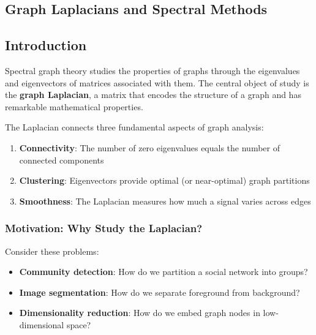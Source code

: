 \begin{notechapter}
\chapter{Graph Laplacians and Spectral Methods}\label{ch:graph-laplacians}

\section{Introduction}

Spectral graph theory studies the properties of graphs through the eigenvalues and eigenvectors of matrices associated with them. The central object of study is the \textbf{graph Laplacian}, a matrix that encodes the structure of a graph and has remarkable mathematical properties.

\begin{keyidea}
The Laplacian connects three fundamental aspects of graph analysis:
\begin{enumerate}
    \item \textbf{Connectivity}: The number of zero eigenvalues equals the number of connected components
    \item \textbf{Clustering}: Eigenvectors provide optimal (or near-optimal) graph partitions
    \item \textbf{Smoothness}: The Laplacian measures how much a signal varies across edges
\end{enumerate}
\end{keyidea}

\subsection{Motivation: Why Study the Laplacian?}

Consider these problems:
\begin{itemize}
    \item \textbf{Community detection}: How do we partition a social network into groups?
    \item \textbf{Image segmentation}: How do we separate foreground from background?
    \item \textbf{Dimensionality reduction}: How do we embed graph nodes in low-dimensional space?
\end{itemize}


\end{notechapter}
